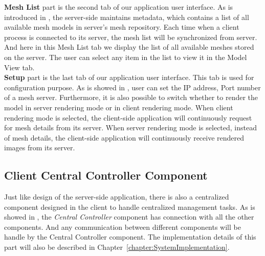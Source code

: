 \textbf{Mesh List} part is the second tab of our application user interface. As is introduced in , the server-side maintains metadata, which contains a list of all available mesh models in server's mesh repository. Each time when a client process is connected to its server, the mesh list will be synchronized from server. And here in this Mesh List tab we display the list of all available meshes stored on the server. The user can select any item in the list to view it in the Model View tab. \\
\textbf{Setup} part is the last tab of our application user interface. This tab is used for configuration purpose. As is showed in , user can set the IP address, Port number of a mesh server. Furthermore, it is also possible to switch whether to render the model in server rendering mode or in client rendering mode. When client rendering mode is selected, the client-side application will continuously request for mesh details from its server. When server rendering mode is selected, instead of mesh details, the client-side application will continuously receive rendered images from its server.  

\subsection{Client Central Controller Component}
\label{section:clientcenconcom} 


Just like design of the server-side application, there is also a centralized component designed in the client to handle centralized management tasks. As is showed in , the \emph{Central Controller} component has connection with all the other components. And any communication between different components will be handle by the Central Controller component. The implementation details of this part will also be described in Chapter~\ref{chapter:SystemImplementation}.





